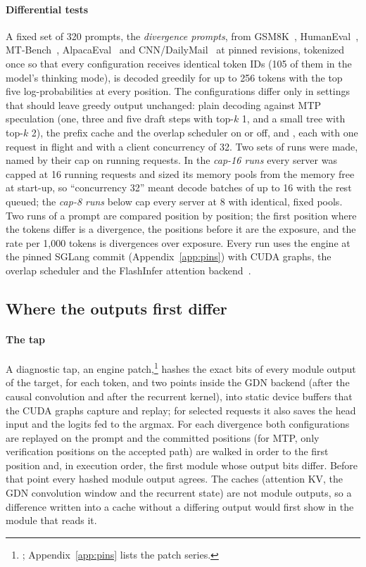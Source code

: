 \paragraph{Differential tests} A fixed set of 320 prompts, the \emph{divergence prompts}, from GSM8K~\cite{gsm8k}, HumanEval~\cite{humaneval}, MT-Bench~\cite{mtbench}, AlpacaEval~\cite{alpacaeval} and CNN/DailyMail~\cite{hermann2015,see2017} at pinned revisions, tokenized once so that every configuration receives identical token IDs (105 of them in the model's thinking mode), is decoded greedily for up to 256 tokens with the top five log-probabilities at every position. The configurations differ only in settings that should leave greedy output unchanged: plain decoding against MTP speculation (one, three and five draft steps with top-$k$ 1, and a small tree with top-$k$ 2), the prefix cache and the overlap scheduler on or off,  and , each with one request in flight and with a client concurrency of 32. Two sets of runs were made, named by their cap on running requests. In the \emph{cap-16 runs} every server was capped at 16 running requests and sized its memory pools from the memory free at start-up, so ``concurrency 32'' meant decode batches of up to 16 with the rest queued; the \emph{cap-8 runs} below cap every server at 8 with identical, fixed pools. Two runs of a prompt are compared position by position; the first position where the tokens differ is a divergence, the positions before it are the exposure, and the rate per 1,000 tokens is divergences over exposure. Every run uses the engine at the pinned SGLang commit (Appendix~\ref{app:pins}) with CUDA graphs, the overlap scheduler and the FlashInfer attention backend~.

\subsection{Where the outputs first differ}\label{app:divergence-locate}
\paragraph{The tap} A diagnostic tap, an engine patch,\footnote{; Appendix~\ref{app:pins} lists the patch series.} hashes the exact bits of every module output of the target, for each token, and two points inside the GDN backend (after the causal convolution and after the recurrent kernel), into static device buffers that the CUDA graphs capture and replay; for selected requests it also saves the head input and the logits fed to the argmax. For each divergence both configurations are replayed on the prompt and the committed positions (for MTP, only verification positions on the accepted path) are walked in order to the first position and, in execution order, the first module whose output bits differ. Before that point every hashed module output agrees. The caches (attention KV, the GDN convolution window and the recurrent state) are not module outputs, so a difference written into a cache without a differing output would first show in the module that reads it.

